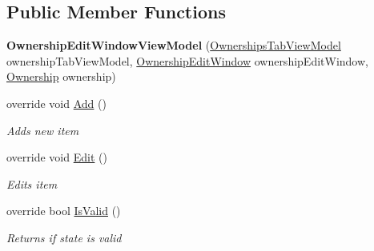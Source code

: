 \subsection*{Public Member Functions}
\begin{DoxyCompactItemize}
\item 
\hypertarget{class_baudi_1_1_client_1_1_view_models_1_1_edit_window_view_models_1_1_ownership_edit_window_view_model_ac6a5302624eaa352e364d5e7cef41229}{}{\bfseries Ownership\+Edit\+Window\+View\+Model} (\hyperlink{class_baudi_1_1_client_1_1_view_models_1_1_tabs_view_models_1_1_ownerships_tab_view_model}{Ownerships\+Tab\+View\+Model} ownership\+Tab\+View\+Model, \hyperlink{class_baudi_1_1_client_1_1_view_1_1_edit_windows_1_1_ownership_edit_window}{Ownership\+Edit\+Window} ownership\+Edit\+Window, \hyperlink{class_baudi_1_1_d_a_l_1_1_models_1_1_ownership}{Ownership} ownership)\label{class_baudi_1_1_client_1_1_view_models_1_1_edit_window_view_models_1_1_ownership_edit_window_view_model_ac6a5302624eaa352e364d5e7cef41229}

\item 
override void \hyperlink{class_baudi_1_1_client_1_1_view_models_1_1_edit_window_view_models_1_1_ownership_edit_window_view_model_acd034e7d09466730e7aa6c4c530ed15f}{Add} ()
\begin{DoxyCompactList}\small\item\em Adds new item \end{DoxyCompactList}\item 
override void \hyperlink{class_baudi_1_1_client_1_1_view_models_1_1_edit_window_view_models_1_1_ownership_edit_window_view_model_ab2ffa8b3be50a482f14995de97d3f304}{Edit} ()
\begin{DoxyCompactList}\small\item\em Edits item \end{DoxyCompactList}\item 
override bool \hyperlink{class_baudi_1_1_client_1_1_view_models_1_1_edit_window_view_models_1_1_ownership_edit_window_view_model_a82f0ab3b2df4452117fd1d4f97ba0cfd}{Is\+Valid} ()
\begin{DoxyCompactList}\small\item\em Returns if state is valid \end{DoxyCompactList}\end{DoxyCompactItemize}
